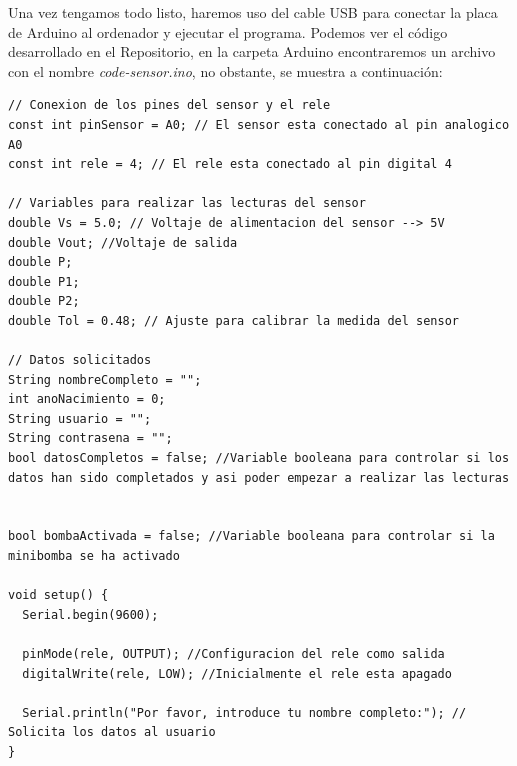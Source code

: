 Una vez tengamos todo listo, haremos uso del cable USB para conectar la placa de Arduino al ordenador y ejecutar el programa. Podemos ver el código desarrollado en el Repositorio, en la carpeta Arduino encontraremos un archivo con el nombre  \textit{code-sensor.ino}, no obstante, se muestra a continuación:
\begin{lstlisting}
// Conexion de los pines del sensor y el rele
const int pinSensor = A0; // El sensor esta conectado al pin analogico A0
const int rele = 4; // El rele esta conectado al pin digital 4

// Variables para realizar las lecturas del sensor
double Vs = 5.0; // Voltaje de alimentacion del sensor --> 5V
double Vout; //Voltaje de salida
double P;
double P1;
double P2;
double Tol = 0.48; // Ajuste para calibrar la medida del sensor

// Datos solicitados
String nombreCompleto = "";
int anoNacimiento = 0;
String usuario = "";
String contrasena = "";
bool datosCompletos = false; //Variable booleana para controlar si los datos han sido completados y asi poder empezar a realizar las lecturas


bool bombaActivada = false; //Variable booleana para controlar si la minibomba se ha activado

void setup() {
  Serial.begin(9600);

  pinMode(rele, OUTPUT); //Configuracion del rele como salida
  digitalWrite(rele, LOW); //Inicialmente el rele esta apagado
  
  Serial.println("Por favor, introduce tu nombre completo:"); // Solicita los datos al usuario
}


\end{lstlisting}
